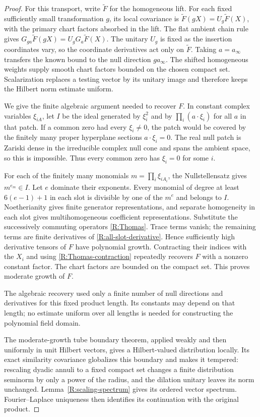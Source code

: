 \begin{proof}
For this transport, write $\widetilde F$ for the homogeneous lift.
For each fixed sufficiently small transformation $g$, its local
covariance is $\widetilde F(gX)=U_g\widetilde F(X)$, with the
primary chart factors absorbed in the lift.  The flat ambient
chain rule gives $G_{ga}\widetilde F(gX)=U_gG_a\widetilde F(X)$.
The unitary $U_g$ is fixed as the insertion coordinates vary, so
the coordinate derivatives act only on $\widetilde F$.  Taking
$a=a_\infty$ transfers the known bound to the null direction
$ga_\infty$.  The shifted homogeneous weights supply smooth
chart factors bounded on the chosen compact set.  Scalarization
replaces a testing vector by its unitary image and therefore keeps
the Hilbert norm estimate uniform.

We give the finite algebraic argument needed to recover $F$.  In
constant complex variables $\xi_{iA}$, let $I$ be the ideal generated by
$\xi_i^2$ and by $\prod_i(a\cdot\xi_i)$ for all $a$ in that patch.
If a common zero had every $\xi_i\ne0$, the patch would be covered by
the finitely many proper hyperplane sections $a\cdot\xi_i=0$.
The real null patch is Zariski dense in the irreducible complex null
cone and spans the ambient space, so this is impossible.  Thus every
common zero has $\xi_i=0$ for some $i$.

For each of the finitely many monomials
$m=\prod_i\xi_{iA_i}$, the Nullstellensatz gives $m^{e_m}\in I$.
Let $e$ dominate their exponents.  Every monomial of degree at least
$6(e-1)+1$ in each slot is divisible by one of the $m^e$ and belongs
to $I$.  Noetherianity gives finite generator representations, and
separate homogeneity in each slot gives multihomogeneous coefficient
representations.  Substitute the successively commuting operators
\eqref{R:Thomas}.  Trace terms vanish; the remaining terms are finite
derivatives of \eqref{R:all-slot-derivative}.  Hence sufficiently high
derivative tensors of $F$ have polynomial growth.  Contracting their
indices with the $X_i$ and using \eqref{R:Thomas-contraction} repeatedly
recovers $F$ with a nonzero constant factor.  The chart factors are
bounded on the compact set.  This proves moderate growth of $F$.

The algebraic recovery used only a finite number of null directions
and derivatives for this fixed product length.  Its constants may
depend on that length; no estimate uniform over all lengths is needed
for constructing the polynomial field domain.

The moderate-growth tube boundary theorem, applied weakly and then
uniformly in unit Hilbert vectors, gives a Hilbert-valued distribution
locally.  Its exact similarity covariance globalizes this boundary
and makes it tempered: rescaling dyadic annuli to a fixed compact set
changes a finite distribution seminorm by only a power of the radius,
and the dilation unitary leaves its norm unchanged.  Lemma~\ref{R:scaling-spectrum}
gives its ordered vector spectrum.  Fourier--Laplace uniqueness
then identifies its continuation with the original product.
\end{proof}

